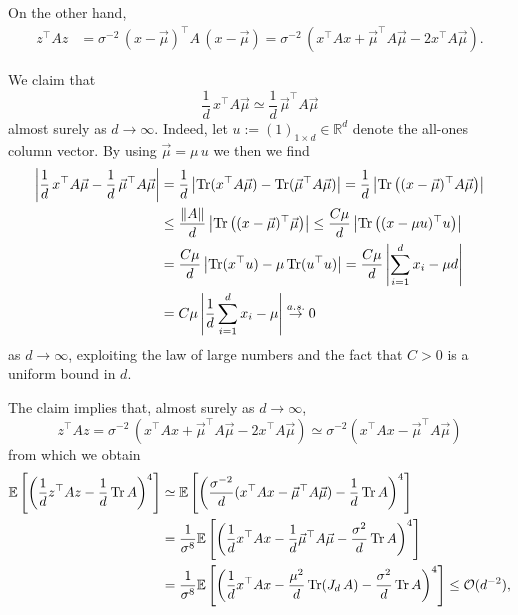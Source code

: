 \documentclass{article}
\begin{document}
On the other hand,
\begin{align}
z^\top A z &= \sigma^{-2}\,(x-\vec{\mu})^\top A\,(x-\vec{\mu}) = \sigma^{-2}\,(x^\top A x + \vec{\mu}^\top A \vec{\mu}-2x^\top A\vec{\mu}).
\end{align}
\par
We claim that
\begin{equation}
\frac{1}{d}\,x^\top A\vec{\mu}\simeq \frac{1}{d}\,\vec{\mu}^\top A\vec{\mu}
\end{equation}
almost surely as $d\to\infty$. Indeed, let $u:=(1)_{1\times d}\in\mathbb{R}^d$ denote the all-ones column vector. By using $\vec{\mu}=\mu\,u$ we then we find
\begin{align}
\left|\frac{1}{d}\,x^\top A\vec{\mu}-\frac{1}{d}\,\vec{\mu}^\top A\vec{\mu}\right| &= \frac{1}{d}\left|\operatorname{Tr}(x^\top A\vec{\mu})-\operatorname{Tr}(\vec{\mu}^\top A\vec{\mu})\right| = \frac{1}{d}\left|\operatorname{Tr}\left((x-\vec{\mu})^\top A\vec{\mu}\right)\right| \notag
\\ &\leq \frac{\|A\|}{d}\left|\operatorname{Tr}\left((x-\vec{\mu})^\top\vec{\mu}\right)\right|\leq\frac{C\mu}{d}\left|\operatorname{Tr}\left((x-\mu u)^\top u\right)\right| \notag
\\ &= \frac{C\mu}{d}\left|\operatorname{Tr}(x^\top u)-\mu\operatorname{Tr}(u^\top u)\right|=\frac{C\mu}{d}\left|\sum_{i=1}^d x_i-\mu d\right| \notag
\\ &= C\mu\left|\frac{1}{d}\sum_{i=1}^d x_i-\mu\right|\stackrel{a.s.}{\to}0
\end{align}
as $d\to\infty$, exploiting the law of large numbers and the fact that $C>0$ is a uniform bound in $d$.
\par
The claim implies that, almost surely as $d\to\infty$,
\begin{equation}
z^\top A z = \sigma^{-2}\,(x^\top A x + \vec{\mu}^\top A \vec{\mu}-2x^\top A\vec{\mu}) \simeq \sigma^{-2}(x^\top A x-\vec{\mu}^\top A\vec{\mu})
\end{equation}
from which we obtain
\begin{align}
\mathbb{E}\left[\left(\frac{1}{d}z^\top A z-\frac{1}{d}\operatorname{Tr}A\right)^4\right] &\simeq \mathbb{E}\left[\left(\frac{\sigma^{-2}}{d}(x^\top A x-\vec{\mu}^\top A\vec{\mu})-\frac{1}{d}\operatorname{Tr}A\right)^4\right] \label{eq:LDC-argument}
\\ &= \frac{1}{\sigma^8}\mathbb{E}\left[\left(\frac{1}{d}x^\top Ax-\frac{1}{d}\vec{\mu}^\top A\vec{\mu}-\frac{\sigma^2}{d}\operatorname{Tr}A\right)^4\right] \notag
\\ &= \frac{1}{\sigma^8}\mathbb{E}\left[\left(\frac{1}{d}x^\top Ax-\frac{\mu^2}{d}\operatorname{Tr}(J_d\,A)-\frac{\sigma^2}{d}\operatorname{Tr}A\right)^4\right]\leq\mathcal{O}(d^{-2}), \notag
\end{align}
\end{document}
